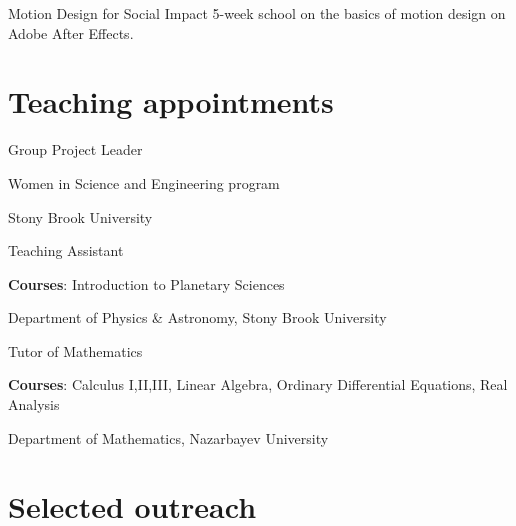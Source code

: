 \documentclass[10pt]{article} %
\begin{document}
\begin{paracol}{1}
	
	
	{Motion Design for Social Impact}
	{5-week school on the basics of motion design on Adobe After Effects. }
	








\section{Teaching appointments} 
	{Group Project Leader}
	{ Women in Science and Engineering program
	
	Stony Brook University}
	
	{Teaching Assistant}
	{\textbf{Courses}: Introduction to Planetary Sciences
	
	Department of Physics \& Astronomy, Stony Brook University}
	
	
	{Tutor of Mathematics}
	{\textbf{Courses}: Calculus I,II,III, Linear Algebra, Ordinary Differential Equations, Real Analysis
	
	Department of Mathematics, Nazarbayev University}

\section{Selected outreach}





\end{paracol}
\end{document}
